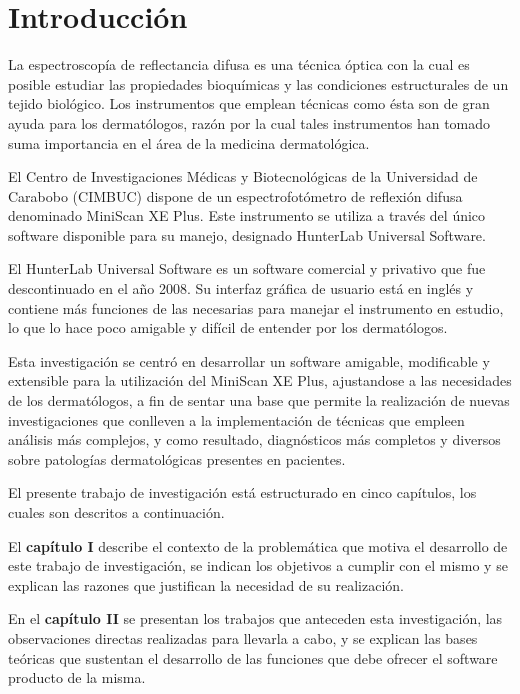 \chapter*{Introducci\'{o}n}


	La espectroscop\'{i}a de reflectancia difusa es una t\'{e}cnica \'{o}ptica con la cual es  posible estudiar las propiedades bioqu\'{i}micas y las condiciones estructurales de un tejido biol\'{o}gico. Los instrumentos que emplean t\'{e}cnicas como \'{e}sta son de gran ayuda para los dermat\'{o}logos, raz\'{o}n por la cual tales instrumentos han tomado suma importancia en el \'{a}rea de la medicina dermatol\'{o}gica.

El Centro de Investigaciones M\'{e}dicas y Biotecnol\'{o}gicas de la Universidad de Carabobo (CIMBUC) dispone de un espectrofot\'{o}metro de reflexi\'{o}n difusa denominado MiniScan XE Plus. Este instrumento se utiliza a trav\'{e}s del \'{u}nico software disponible para su manejo, designado HunterLab Universal Software.

El HunterLab Universal Software es un software comercial y privativo que fue descontinuado en el a\~{n}o 2008. Su interfaz gr\'{a}fica de usuario est\'{a} en ingl\'{e}s y contiene m\'{a}s funciones de las necesarias para manejar el instrumento en estudio, lo que lo hace poco amigable y dif\'{i}cil de entender por los dermat\'{o}logos.

Esta investigaci\'{o}n se centr\'{o} en desarrollar un software amigable, modificable y extensible para la utilizaci\'{o}n del MiniScan XE Plus, ajustandose a las necesidades de los dermat\'{o}logos, a fin de sentar una base que permite la realizaci\'{o}n de nuevas investigaciones que conlleven a la implementaci\'{o}n de t\'{e}cnicas que empleen an\'{a}lisis m\'{a}s complejos, y como resultado, diagn\'{o}sticos m\'{a}s completos y diversos sobre patolog\'{i}as dermatol\'{o}gicas presentes en pacientes.

\newpage
\thispagestyle{plain}
	El presente trabajo de investigaci\'{o}n est\'{a} estructurado en cinco cap\'{i}tulos, los cuales son descritos a continuaci\'{o}n.

	El \textbf{cap\'{i}tulo I} describe el contexto de la problem\'{a}tica que motiva el desarrollo de este trabajo de investigaci\'{o}n, se indican los objetivos a cumplir con el mismo y se explican las razones que justifican la necesidad de su realizaci\'{o}n.

	En el \textbf{cap\'{i}tulo II} se presentan los trabajos que anteceden esta investigaci\'{o}n, las observaciones directas realizadas para llevarla a cabo, y se explican las bases te\'{o}ricas que sustentan el desarrollo de las funciones que debe ofrecer el software producto de la misma.


